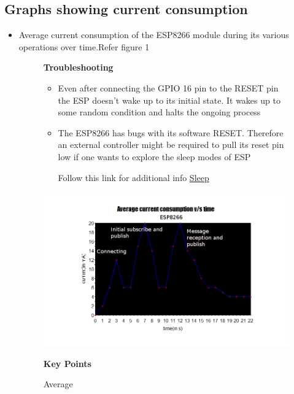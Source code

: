\documentclass[16pt]{article}
\begin{document}
\vspace{0.5cm}
\subsection{Graphs showing current consumption}

\begin{itemize}

\item
  Average current consumption of the ESP8266 module during its various
  operations over time.Refer figure 1 


\begin{figure}

\textbf{Troubleshooting}

\vspace{0.2cm}
\begin{itemize}
\item
  Even after connecting the GPIO 16 pin to the RESET pin the ESP doesn't
  wake up to its initial state. It wakes up to some random condition and
  halts the ongoing process
\item
  The ESP8266 has bugs with its software RESET. Therefore an external
  controller might be required to pull its reset pin low if one wants to
  explore the sleep modes of ESP
  
  Follow this link for additional info
\href{http://tinker.yeoman.com.au/2015/03/08/reducing-esp8266-power-consumption-using-deep-sleep/}{Sleep}
\end{itemize}
\includegraphics[width=1.2\textwidth]{images/average_current1.png}
\caption{Average}
\textbf{Key Points}

  \begin{itemize}


\end{itemize}
\end{figure}
\end{itemize}
\end{document}
